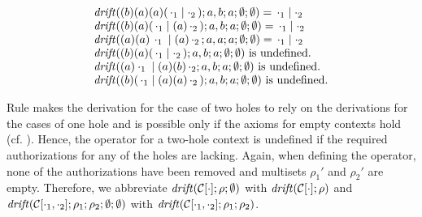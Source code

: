 \begin{example}

\[
  \begin{array}{l}
    \opholes{\scope\NB \scope \NA \scope \NA (\, \cdot_1 \parop \cdot_2\,) }{ \NA,\NB}{\NA}{\emptyset}{\emptyset} = \,\cdot_1 \parop \cdot_2 \\
    \opholes{\scope\NB \scope \NA ( \,\cdot_1 \parop \scope\NA\, \cdot_2\,) }{ \NA,\NB}{\NA}{\emptyset}{\emptyset} = \,\cdot_1 \parop \cdot_2 \\%
    \opholes{\scope\NA\scope\NA  \,\cdot_1 \parop \scope\NA \,\cdot_2 \,}{ \NA,\NA }{\NA}{\emptyset}{\emptyset} = \,\cdot_1 \parop \cdot_2 \\
    \opholes{\scope\NB\scope\NA ( \,\cdot_1 \parop \cdot_2\,)}{ \NA,\NB}{\NA}{\emptyset}{\emptyset} \text{ is undefined.}\\
        \opholes{  \scope\NA\cdot_1 \parop  \scope\NA \scope\NB\, \cdot_2}{ \NA,\NB}{\NA}{\emptyset}{\emptyset} \text{ is undefined.} \\
    \opholes{\scope\NB ( \,\cdot_1 \parop \scope\NA \scope\NA\, \cdot_2\,)}{ \NA,\NB}{\NA}{\emptyset}{\emptyset} \text{ is undefined.} \\
  \end{array}
\]
\end{example}

%
Rule  makes the derivation for the case of two holes to rely %
on the derivations for the cases of one hole and is possible only if the axioms for empty contexts hold (cf. ). 
Hence, the operator for a two-hole context is undefined if the required authorizations for any of the holes are lacking. Again, when defining the operator, none of the authorizations have been removed and 
multisets $\rho_1'$ and $\rho_2'$ are empty. Therefore, we abbreviate $\mathit {drift}(\mathcal{C}[\cdot];\rho
; \emptyset )$ with $\mathit {drift}(\mathcal{C}[\cdot]; \rho
)
$ and $\mathit {drift}(\mathcal{C}[\cdot_1,\cdot_2];
\rho_1
;\rho_2
; \emptyset; \emptyset)$ with
$\mathit {drift}(\mathcal{C}[\cdot_1,\cdot_2];\rho_1
;\rho_2
)$.

